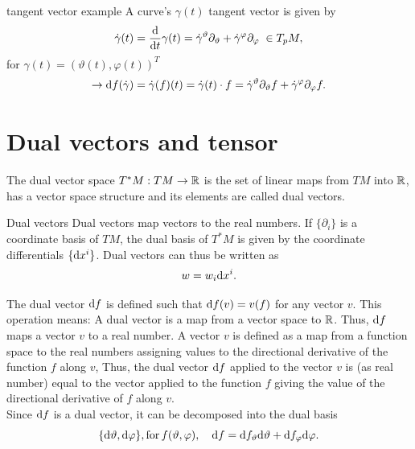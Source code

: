 \begin{mybox}{tangent vector example}
	A curve's $\gamma(t)$ tangent vector is given by 
	\begin{equation}
	 \dot{\gamma}(t) = \frac{\mathrm{d}}{\mathrm{d} t} \gamma(t) = \dot{\gamma}^{\vartheta} \partial_{\vartheta} + \dot{\gamma}^{\varphi} \partial_{\varphi} \; \in T_p M,
	\end{equation}
	for $\gamma(t) = (\vartheta(t), \varphi(t))^T$
	\begin{equation}
	\rightarrow \mathrm{d} f(\dot{\gamma}) = \dot{\gamma}(f)(t) = \dot{\gamma}(t) \cdot f = \dot{\gamma}^{\vartheta} \partial_{\vartheta}f + \dot{\gamma}^{\varphi} \partial_{\varphi} f.
	\end{equation}
\end{mybox}

\section{Dual vectors and tensor}
The dual vector space $T^*M: TM \rightarrow \mathbb{R}$ is the set of linear maps from $TM$ into $\mathbb{R}$, has a vector space structure and its elements are called dual vectors.
\begin{mybox}{Dual vectors}
	Dual vectors map vectors to the real numbers. If $\{\partial_i\}$ is a coordinate basis of $TM$, the dual basis of $T^*M$ is given by the coordinate differentials $\{\mathrm{d} x^i \}$. Dual vectors can thus be written as \begin{equation}
	w=w_i \mathrm{d} x^i.
	\end{equation}
\end{mybox}
The dual vector $\mathrm{d} f$ is defined such that $\mathrm{d} f(v) = v(f)$ for any vector $v$. This operation means: A dual vector is a map from a vector space to $\mathbb{R}$. Thus, $\mathrm{d} f$ maps a vector $v$ to a real number. A vector $v$ is defined as a map from a function space to the real numbers assigning values to the directional derivative of the function $f$ along $v$, Thus, the dual vector $\mathrm{d} f$ applied to the vector $v$ is (as real number) equal to the vector applied to the function $f$ giving the value of the directional derivative of $f$ along $v$.\\
Since $\mathrm{d} f$ is a dual vector, it can be decomposed into the dual basis 
\begin{equation}
	\{\mathrm{d} \vartheta, \mathrm{d} \varphi \}, \mathrm{ for} \, f(\vartheta, \varphi), \quad \mathrm{d} f = \mathrm{d} f_{\vartheta} \mathrm{d} \vartheta + \mathrm{d} f_{\varphi} \mathrm{d} \varphi.
\end{equation}
